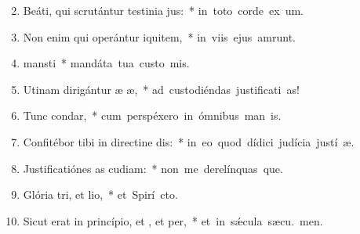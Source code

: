 \begin{flushleft}
\begin{enumerate}[leftmargin=*]
\setcounter{enumi}{1}

\item Beáti, qui scrutántur testinia jus:~* \mbox{in toto corde ex um.}
\item Non enim qui operántur iquitem,~* \mbox{in viis ejus amrunt.}
\item {} mansti~* \mbox{mandáta tua custo mis.}
\item Utinam dirigántur æ æ,~* \mbox{ad custodiéndas justificati as!}
\item Tunc  condar,~* \mbox{cum perspéxero in ómnibus man is.}
\item Confitébor tibi in directine dis:~* \mbox{in eo quod dídici judícia justí æ.}
\item Justificatiónes as cudiam:~* \mbox{non me derelínquas que.}
\item Glória tri, et lio,~* \mbox{et Spirí cto.}
\item Sicut erat in princípio, et , et per,~* \mbox{et in s\'{\ae}cula sæcu. men.}


\end{enumerate}
\end{flushleft}

